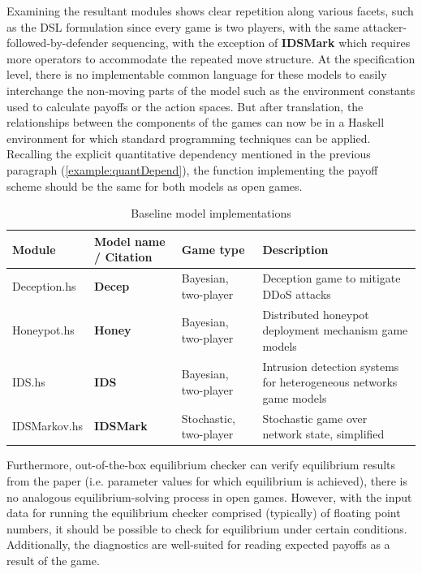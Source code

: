 \documentclass[11pt,titlepage,dvipsnames,table,xcdraw,english]{article}
\begin{document}
Examining the resultant modules shows clear repetition along various facets, such as the DSL formulation since every game is two players, with the same attacker-followed-by-defender sequencing, with the exception of \textbf{IDSMark} which requires more operators to accommodate the repeated move structure. At the specification level, there is no implementable common language for these models to easily interchange the non-moving parts of the model such as the environment constants used to calculate payoffs or the action spaces. But after translation, the relationships between the components of the games can now be in a Haskell environment for which standard programming techniques can be applied. Recalling the explicit quantitative dependency mentioned in the previous paragraph (\ref{example:quantDepend}), the function implementing the payoff scheme should be the same for both models as open games.

\begin{table}[h!]
\centering
\setlength{\tabcolsep}{4pt} %
\renewcommand{\arraystretch}{1.3} %

\begin{tabularx}{\textwidth}{| >{\hsize=0.85\hsize}X 
                               >{\hsize=0.80\hsize}X 
                               >{\hsize=0.75\hsize}X 
                               >{\hsize=1.60\hsize}X |} 
 \hline
 \textbf{Module} & \textbf{Model name / Citation} & \textbf{Game type} & \textbf{Description} \\ 
 \hline\hline
 Deception.hs & \textbf{Decep} \cite{cceker2016deception} & Bayesian, two-player & Deception game to mitigate DDoS attacks \\ 
 Honeypot.hs & \textbf{Honey} \cite{li2019game} & Bayesian, two-player & Distributed honeypot deployment mechanism game models \\
 IDS.hs & \textbf{IDS} \cite{Chen2009} & Bayesian, two-player & Intrusion detection systems for heterogeneous networks game models \\
 IDSMarkov.hs & \textbf{IDSMark} \cite{lye2005game} & Stochastic, two-player & Stochastic game over network state, simplified \\ 
 \hline
\end{tabularx}
\caption{Baseline model implementations}
\label{table:baseline}
\end{table}




Furthermore, out-of-the-box equilibrium checker can verify equilibrium results from the paper (i.e. parameter values for which equilibrium is achieved), there is no analogous equilibrium-solving process in open games. However, with the input data for running the equilibrium checker comprised (typically) of floating point numbers, it should be possible to check for equilibrium under certain conditions. Additionally, the diagnostics are well-suited for reading expected payoffs as a result of the game. 
\end{document}
